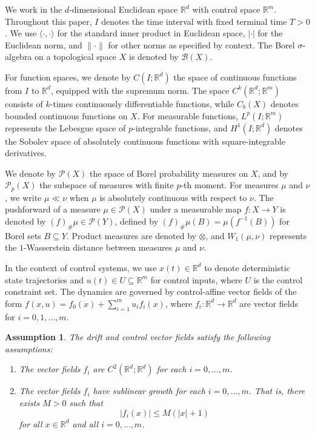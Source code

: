 \documentclass{article}
\newtheorem{assumption}[theorem]{Assumption}
\begin{document}
We work in the $d$-dimensional Euclidean space $\mathbb{R}^d$
with control space $\mathbb{R}^m$. Throughout this paper,
$I$ denotes the time interval with fixed terminal time $T > 0$.
We use $\langle \cdot, \cdot \rangle$ for the standard inner
product in Euclidean space, $|\cdot|$ for the Euclidean norm,
and $\|\cdot\|$ for other norms as specified by context. The Borel
$\sigma$-algebra on a topological space $X$ is denoted by
$\mathcal{B}(X)$.

For function spaces, we denote by $C(I; \mathbb{R}^d)$ the space
of continuous functions from $I$ to $\mathbb{R}^d$, equipped with
the supremum norm. The space $C^k(\mathbb{R}^d; \mathbb{R}^m)$
consists of $k$-times continuously differentiable functions,
while $C_b(X)$ denotes bounded continuous functions on $X$. For
measurable functions, $L^p(I; \mathbb{R}^m)$ represents the
Lebesgue space of $p$-integrable functions, and
$H^1(I; \mathbb{R}^d)$ denotes the Sobolev space of absolutely
continuous functions with square-integrable derivatives.

We denote by $\mathcal{P}(X)$ the space of Borel probability
measures on $X$, and by $\mathcal{P}_p(X)$ the subspace of
measures with finite $p$-th moment. For measures $\mu$ and $\nu$,
we write $\mu \ll \nu$ when $\mu$ is absolutely continuous with
respect to $\nu$. The pushforward of a measure
$\mu \in \mathcal{P}(X)$ under a measurable map $f: X \to Y$ is
denoted by $(f)_\#\mu \in \mathcal{P}(Y)$, defined by
$(f)_\#\mu(B) = \mu(f^{-1}(B))$ for Borel sets $B \subseteq Y$.
Product measures are denoted by $\otimes$, and $W_1(\mu,\nu)$
represents the $1$-Wasserstein distance between measures $\mu$ and
$\nu$.

In the context of control systems, we use $x(t) \in \mathbb{R}^d$
to denote deterministic state trajectories and
$u(t) \in U \subseteq \mathbb{R}^m$ for control inputs, where $U$
is the control constraint set. The dynamics are governed by
control-affine vector fields of the form
$f(x,u) = f_0(x) + \sum_{i=1}^m u_i f_i(x)$, where
$f_i: \mathbb{R}^d \to \mathbb{R}^d$ are vector fields for
$i = 0,1,\ldots,m$.

\begin{assumption}\label{asmp:sublin}
The drift and control vector fields satisfy the following
assumptions:
\begin{enumerate}
\item The vector fields $f_i$ are
$C^2(\mathbb{R}^d;\mathbb{R}^d)$ for each $i = 0,\ldots,m$. 
\item The vector fields $f_i$ have sublinear growth for each
$i = 0,\ldots,m$. That is, there exists $M>0$ such that 
\[|f_i(x)| \leq M(|x|+1)\]
for all $x \in \mathbb{R}^d$ and all $i = 0,\ldots,m$.
\end{enumerate}
\end{assumption}
\end{document}

